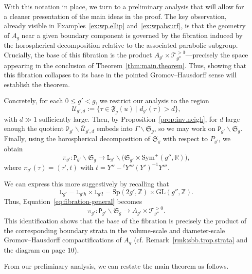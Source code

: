 \documentclass[11pt]{amsart}
\theoremstyle{plain}
\theoremstyle{definition}
\theoremstyle{remark}
\newcommand{\Z}{\mathbb{Z}}
\newcommand{\fS}{\mathfrak{S}}
\newcommand{\sym}{\mathrm{Sym}^{\!+}}
\newcommand{\Sp}{\mathrm{Sp}}
\newcommand{\tP}{\mathtt{P}}
\newcommand{\tL}{\mathtt{L}}
\newcommand{\fF}{\mathfrak{F}}
\newcommand{\cT}[1]{\mathscr{T}_{#1}^{\scriptscriptstyle{>0}}}
\begin{document}
With this notation in place, we turn to a preliminary analysis that will allow for a cleaner presentation of the main ideas in the proof. The key observation, already visible in Examples~\ref{ex:wp.ellip} and~\ref{ex:wpabsurf}, is that the geometry of $A_g$ near a given boundary component is governed by the fibration induced by the horospherical decomposition relative to the associated parabolic subgroup. Crucially, the base of this fibration is the product 
$A_{g'}\times\cT{g''}$---precisely the space appearing in the 
conclusion of Theorem~\ref{thm:main.theorem}. Thus, showing that this fibration collapses to its 
base in the pointed Gromov--Hausdorff sense will establish the theorem. 

Concretely, for each $0 \leq g' < g$, we restrict our analysis to the region
\[
\mathcal{U}_{g'\!,d} := \{\tau \in \fF_g(u) \mid d_{g'}(\tau) > d\},
\]
with $d \gg 1$ sufficiently large. Then, by Proposition~\ref{prop:inv.neigh}, 
for $d$ large enough the quotient $\tP_{g'} \backslash \overline{\mathcal{U}}_{g'\!,d}$ embeds into 
$\Gamma \backslash \fS_g$, so we may work on $\tP_{g'} \backslash \fS_g$.
Finally, using the horospherical decomposition of $\fS_g$ with respect to $P_{g'}$, 
we obtain
\begin{equation}\label{eq:fibration-general}
\pi_{g'} : \tP_{g'} \backslash \fS_g \to \tL_{g'} \backslash 
\big(\fS_{g'} \times \sym(g'', \mathbb{R})\big),
\end{equation}
where $\pi_{g'}(\tau) = (\tau',t)$ with $t = Y'' - {}^tY'''(Y')^{-1}Y'''$.

We can express this more suggestively by recalling that 
\[
\tL_{g'} = \tL_{g'h} \times \tL_{g'l} = \Sp(2g',\Z) \times \mathrm{GL}(g'',\Z).
\]
Thus, Equation~\eqref{eq:fibration-general} becomes
\begin{equation}\label{eq:fibration-modular}
\pi_{g'} : \tP_{g'} \backslash \fS_g \to A_{g'} \times 
\cT{g''}.
\end{equation}
This identification shows that the base of the fibration is precisely the product of 
the corresponding boundary strata in the volume-scale and diameter-scale Gromov--Hausdorff 
compactifications of $A_g$ (cf. Remark~\ref{rmk:sbb.trop.strata} and the diagram on 
page $10$).

From our preliminary analysis, we can restate the main theorem as follows.
\end{document}
